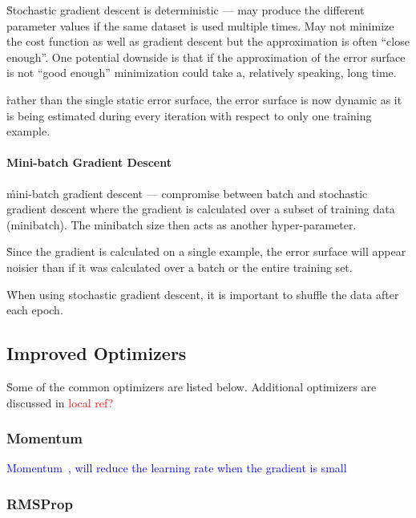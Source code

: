\r{Stochastic gradient descent is deterministic --- may produce the different parameter values if the same dataset is used multiple times. May not minimize the cost function as well as gradient descent but the approximation is often ``close enough''. One potential downside is that if the approximation of the error surface is not ``good enough'' minimization could take a, relatively speaking, long time.}

\r{rather than the single static error surface, the error surface is now dynamic as it is being estimated during every iteration with respect to only one training example.}


\paragraph{Mini-batch Gradient Descent}

\r{mini-batch gradient descent --- compromise between batch and stochastic gradient descent where the gradient is calculated over a subset of training data (minibatch). The minibatch size then acts as another hyper-parameter.}

\r{Since the gradient is calculated on a single example, the error surface will appear noisier than if it was calculated over a batch or the entire training set.}

\r{When using stochastic gradient descent, it is important to shuffle the data after each epoch.}



\subsection{Improved Optimizers}

\r{Some of the common optimizers are listed below. Additional optimizers are discussed in \textcolor{red}{local ref?}}

\subsubsection{Momentum}

\textcolor{blue}{Momentum~\cite{qian1999momentum}, will reduce the learning rate when the gradient is small}

\subsubsection{RMSProp}

